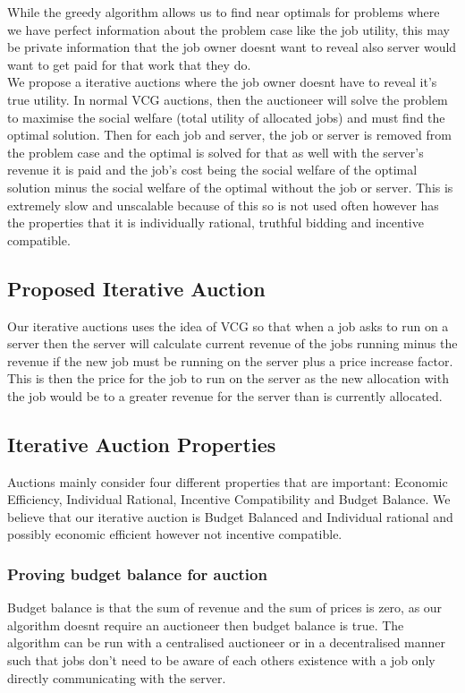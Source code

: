 While the greedy algorithm allows us to find near optimals for problems where we have perfect information about the
problem case like the job utility, this may be private information that the job owner doesnt want to reveal also
server would want to get paid for that work that they do. \\
We propose a iterative auctions where the job owner doesnt have to reveal it's true utility. In normal VCG auctions,
then the auctioneer will solve the problem to maximise the social welfare (total utility of allocated jobs) and
must find the optimal solution. Then for each job and server, the job or server is removed from the problem case and the
optimal is solved for that as well with the server's revenue it is paid and the job's cost being the social welfare of
the optimal solution minus the social welfare of the optimal without the job or server. This is extremely slow and
unscalable because of this so is not used often however has the properties that it is individually rational, truthful
bidding and incentive compatible. \\

\subsection{Proposed Iterative Auction}\label{subsec:proposed-iterative-auction}
Our iterative auctions uses the idea of VCG so that when a job asks to run on a server then the server will calculate
current revenue of the jobs running minus the revenue if the new job must be running on the server plus a price increase
factor. This is then the price for the job to run on the server as the new allocation with the job would be to a greater
revenue for the server than is currently allocated.

\subsection{Iterative Auction Properties}\label{subsec:iterative-auction-properties}
Auctions mainly consider four different properties that are important: Economic Efficiency, Individual Rational,
Incentive Compatibility and Budget Balance. We believe that our iterative auction is Budget Balanced and Individual rational
and possibly economic efficient however not incentive compatible. \\

\subsubsection{Proving budget balance for auction}
Budget balance is that the sum of revenue and the sum of prices is zero, as our algorithm doesnt require an auctioneer
then budget balance is true. The algorithm can be run with a centralised auctioneer or in a decentralised manner such that
jobs don't need to be aware of each others existence with a job only directly communicating with the server.
